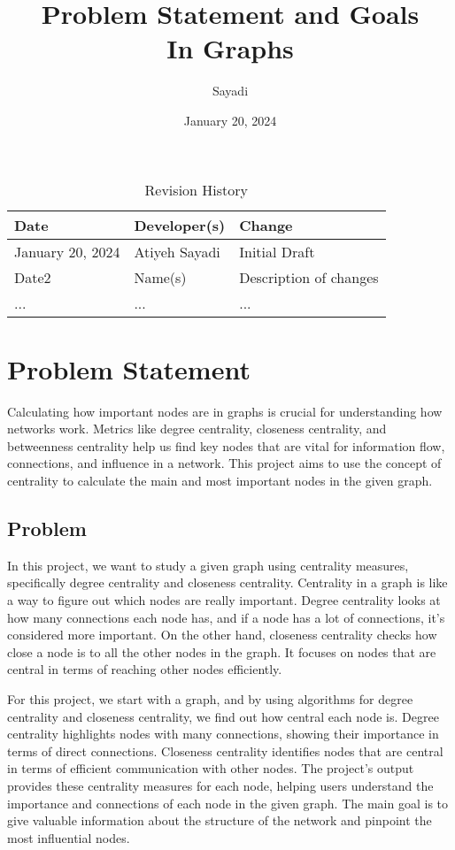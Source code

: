 \documentclass{article}
\title{Problem Statement and Goals\\\Centrality In Graphs}
\author{\Atiyeh Sayadi}
\date{January 20, 2024}
\begin{document}
\maketitle

\begin{table}[hp]
\caption{Revision History} \label{TblRevisionHistory}
\begin{tabularx}{\textwidth}{llX}
\toprule
\textbf{Date} & \textbf{Developer(s)} & \textbf{Change}\\
\midrule
January 20, 2024 & Atiyeh Sayadi & Initial Draft\\
Date2 & Name(s) & Description of changes\\
... & ... & ...\\
\bottomrule
\end{tabularx}
\end{table}

\section{Problem Statement}

Calculating how important nodes are in graphs is crucial for understanding how networks work. Metrics like degree centrality, closeness centrality, and betweenness centrality help us find key nodes that are vital for information flow, connections, and influence in a network. This project aims to use the concept of centrality to calculate the main and most important nodes in the given graph.

\subsection{Problem}

In this project, we want to study a given graph using centrality measures, specifically degree centrality and closeness centrality. Centrality in a graph is like a way to figure out which nodes are really important. Degree centrality looks at how many connections each node has, and if a node has a lot of connections, it's considered more important. On the other hand, closeness centrality checks how close a node is to all the other nodes in the graph. It focuses on nodes that are central in terms of reaching other nodes efficiently.

For this project, we start with a graph, and by using algorithms for degree centrality and closeness centrality, we find out how central each node is. Degree centrality highlights nodes with many connections, showing their importance in terms of direct connections. Closeness centrality identifies nodes that are central in terms of efficient communication with other nodes. The project's output provides these centrality measures for each node, helping users understand the importance and connections of each node in the given graph. The main goal is to give valuable information about the structure of the network and pinpoint the most influential nodes.
\end{document}
